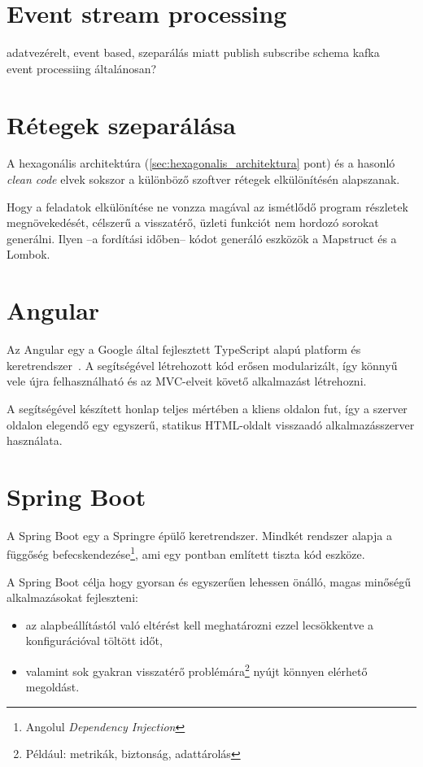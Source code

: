 \section{Event stream processing}
adatvezérelt, event based, szeparálás miatt 
publish subscribe
 schema
 kafka\\
event processiing általánosan?


\section{Rétegek szeparálása}\label{sec:retegek_szeparalasa}
A hexagonális architektúra (\ref{sec:hexagonalis_architektura} pont) és a hasonló \textit{clean code} \cite{clean_code_chapter_systems} elvek sokszor a különböző szoftver rétegek elkülönítésén alapszanak.


Hogy a feladatok elkülönítése ne vonzza magával az ismétlődő program részletek megnövekedését, célszerű a visszatérő, üzleti funkciót nem hordozó sorokat generálni. Ilyen --a fordítási időben-- kódot generáló eszközök a Mapstruct és a Lombok.


\section{Angular}\label{sec:angular}
Az \foreignlanguage{british}{Angular} egy a \foreignlanguage{british}{Google} által fejlesztett \foreignlanguage{british}{TypeScript} alapú platform és		 keretrendszer~\cite{angular_docs}. A segítségével létrehozott kód erősen modularizált, így könnyű vele újra felhasználható és az MVC-elveit követő alkalmazást létrehozni.

A segítségével készített honlap teljes mértében a kliens oldalon fut, így a szerver oldalon elegendő egy egyszerű, statikus HTML-oldalt visszaadó alkalmazásszerver használata.


\section{Spring Boot}\label{sec:spring_boot}
A \foreignlanguage{british}{Spring Boot} egy a Springre épülő keretrendszer. Mindkét rendszer alapja a függőség befecskendezése\footnote{Angolul \foreignlanguage{british}{\textit{Dependency Injection}}}, ami egy  pontban említett tiszta kód \cite{clean_code_chapter_systems} eszköze.

A Spring Boot \cite{introducing_spring_boot} célja hogy gyorsan és egyszerűen lehessen önálló, magas minőségű alkalmazásokat fejleszteni:
\begin{itemize}
	\item az alapbeállítástól való eltérést kell meghatározni ezzel lecsökkentve a konfigurációval töltött időt,
	\item valamint sok gyakran visszatérő problémára\footnote{Például: metrikák, biztonság, adattárolás} nyújt könnyen elérhető megoldást.
\end{itemize}



